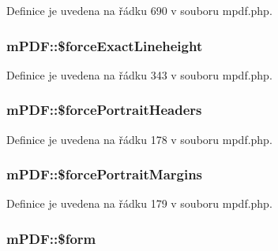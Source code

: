 Definice je uvedena na řádku 690 v souboru mpdf.\-php.

\hypertarget{classm_p_d_f_a47e05dab97877ceca1db912067cc602d}{
\subsubsection[{\$force\-Exact\-Lineheight}]{\setlength{\rightskip}{0pt plus 5cm}m\-P\-D\-F\-::\$force\-Exact\-Lineheight}}\label{classm_p_d_f_a47e05dab97877ceca1db912067cc602d}


Definice je uvedena na řádku 343 v souboru mpdf.\-php.

\hypertarget{classm_p_d_f_aa0c7644f18c1d1b4ba6069cad409b5d2}{
\subsubsection[{\$force\-Portrait\-Headers}]{\setlength{\rightskip}{0pt plus 5cm}m\-P\-D\-F\-::\$force\-Portrait\-Headers}}\label{classm_p_d_f_aa0c7644f18c1d1b4ba6069cad409b5d2}


Definice je uvedena na řádku 178 v souboru mpdf.\-php.

\hypertarget{classm_p_d_f_a0a6e7bacb6f6abf9a80cd32b7d58584d}{
\subsubsection[{\$force\-Portrait\-Margins}]{\setlength{\rightskip}{0pt plus 5cm}m\-P\-D\-F\-::\$force\-Portrait\-Margins}}\label{classm_p_d_f_a0a6e7bacb6f6abf9a80cd32b7d58584d}


Definice je uvedena na řádku 179 v souboru mpdf.\-php.

\hypertarget{classm_p_d_f_a0c3fadbb6af46f5b6967e1a46138771d}{
\subsubsection[{\$form}]{\setlength{\rightskip}{0pt plus 5cm}m\-P\-D\-F\-::\$form}}\label{classm_p_d_f_a0c3fadbb6af46f5b6967e1a46138771d}


